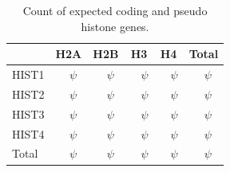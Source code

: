 \documentclass[10pt,a4paper,onecolumn,article]{memoir}
\begin{document}
      \begin{table}
        \caption{Count of expected coding and pseudo histone genes.}
        \label{tab:histone-gene-count}
        \centering
        \begin{tabular}{l r@{ + }l<{$\psi$} r@{ + }l<{$\psi$} r@{ + }l<{$\psi$} r@{ + }l<{$\psi$} r@{ + }l<{$\psi$}}
          \toprule
          \null   & \multicolumn{2}{c}{H2A}  & \multicolumn{2}{c}{H2B}
                  & \multicolumn{2}{c}{H3}   & \multicolumn{2}{c}{H4}
                  & \multicolumn{2}{c}{Total} \\
          \midrule
          HIST1   & \HISTOneHTwoACoding{}     & \HISTOneHTwoAPseudo{}
                  & \HISTOneHTwoBCoding{}     & \HISTOneHTwoBPseudo{}
                  & \HISTOneHThreeCoding{}    & \HISTOneHThreePseudo{}
                  & \HISTOneHFourCoding{}     & \HISTOneHFourPseudo{}
                  & \CodingGenesInHISTOne{}   & \PseudoGenesInHISTOne{} \\
          HIST2   & \HISTTwoHTwoACoding{}     & \HISTTwoHTwoAPseudo{}
                  & \HISTTwoHTwoBCoding{}     & \HISTTwoHTwoBPseudo{}
                  & \HISTTwoHThreeCoding{}    & \HISTTwoHThreePseudo{}
                  & \HISTTwoHFourCoding{}     & \HISTTwoHFourPseudo{}
                  & \CodingGenesInHISTTwo{}   & \PseudoGenesInHISTTwo{} \\
          HIST3   & \HISTThreeHTwoACoding{}   & \HISTThreeHTwoAPseudo{}
                  & \HISTThreeHTwoBCoding{}   & \HISTThreeHTwoBPseudo{}
                  & \HISTThreeHThreeCoding{}  & \HISTThreeHThreePseudo{}
                  & \HISTThreeHFourCoding{}   & \HISTThreeHFourPseudo{}
                  & \CodingGenesInHISTThree{} & \PseudoGenesInHISTThree{} \\
          HIST4   & \HISTFourHTwoACoding{}    & \HISTFourHTwoAPseudo{}
                  & \HISTFourHTwoBCoding{}    & \HISTFourHTwoBPseudo{}
                  & \HISTFourHThreeCoding{}   & \HISTFourHThreePseudo{}
                  & \HISTFourHFourCoding{}    & \HISTFourHFourPseudo{}
                  & \CodingGenesInHISTFour{}  & \PseudoGenesInHISTFour{} \\
          \addlinespace
          Total   & \TotalCodingHTwoA{}       & \TotalPseudoHTwoA{}
                  & \TotalCodingHTwoB{}       & \TotalPseudoHTwoB{}
                  & \TotalCodingHThree{}      & \TotalPseudoHThree{}
                  & \TotalCodingHFour{}       & \TotalPseudoHFour{} \\
          \bottomrule
        \end{tabular}
      \end{table}
\end{document}
